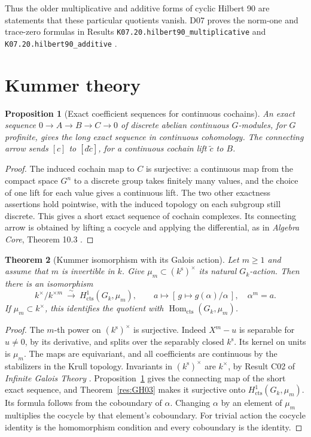\documentclass[11pt,oneside,openany]{book}
\newtheorem{theorem}{Theorem}[chapter]
\newtheorem{proposition}[theorem]{Proposition}
\theoremstyle{definition}
\theoremstyle{remark}
\begin{document}
Thus the older multiplicative and additive forms of cyclic
Hilbert 90 are statements that these particular quotients vanish.
D07 proves the norm-one and trace-zero formulas in Results
\texttt{K07.20.hilbert90\_multiplicative} and
\texttt{K07.20.hilbert90\_additive} \cite[PDF pp.~171--172]{mg-d07}.

\section{Kummer theory}

\begin{proposition}[Exact coefficient sequences for continuous cochains]
\label{res:GH05}
An exact sequence \(0\to A\to B\to C\to0\) of discrete abelian
continuous \(G\)-modules, for \(G\) profinite, gives the long exact
sequence in continuous cohomology. The connecting arrow sends
\([c]\) to \([d\widetilde c]\), for a continuous cochain lift
\(\widetilde c\) to \(B\).
\end{proposition}
\begin{proof}
The induced cochain map to \(C\) is surjective: a continuous map from
the compact space \(G^n\) to a discrete group takes finitely many
values, and the choice of one lift for each value gives a continuous
lift. The two other exactness assertions hold pointwise, with the
induced topology on each subgroup still discrete. This gives a
short exact sequence of cochain complexes. Its connecting arrow
is obtained by lifting a cocycle and applying the differential,
as in \emph{Algebra Core}, Theorem 10.3
\cite[PDF p.~51]{mg-algebra-core}.
\end{proof}

\begin{theorem}[Kummer isomorphism with its Galois action]
\label{res:GH06}
Let \(m\geq 1\) and assume that \(m\) is invertible in \(k\). Give
\(\mu_m\subset(k^{\mathrm s})^\times\) its natural \(G_k\)-action.
Then there is an isomorphism
\[
 k^\times/k^{\times m}
   \ \xrightarrow{\ \sim\ }\ H^1_{\mathrm{cts}}(G_k,\mu_m),
 \qquad
 a\longmapsto [\,g\mapsto g(\alpha)/\alpha\,],\quad \alpha^m=a.
\]
If \(\mu_m\subset k^\times\), this identifies the quotient with
\(\operatorname{Hom}_{\mathrm{cts}}(G_k,\mu_m)\).
\end{theorem}
\begin{proof}
The \(m\)-th power on \((k^{\mathrm s})^\times\) is surjective.
Indeed \(X^m-u\) is separable for \(u\ne0\), by its derivative, and
splits over the separably closed \(k^{\mathrm s}\). Its kernel on
units is \(\mu_m\). The maps are equivariant, and all coefficients
are continuous by the stabilizers in the Krull topology.
Invariants in \((k^{\mathrm s})^\times\) are \(k^\times\), by
Result C02 of \emph{Infinite Galois Theory}
\cite[PDF p.~12]{mg-aft}. Proposition~\ref{res:GH05} gives the connecting
map of the short exact sequence, and Theorem~\ref{res:GH03} makes it
surjective onto \(H^1_{\mathrm{cts}}(G_k,\mu_m)\). Its formula follows
from the coboundary of \(\alpha\). Changing \(\alpha\) by an element of
\(\mu_m\) multiplies the cocycle by that element's coboundary. For
trivial action the cocycle identity is the homomorphism condition and
every coboundary is the identity.
\end{proof}
\end{document}
